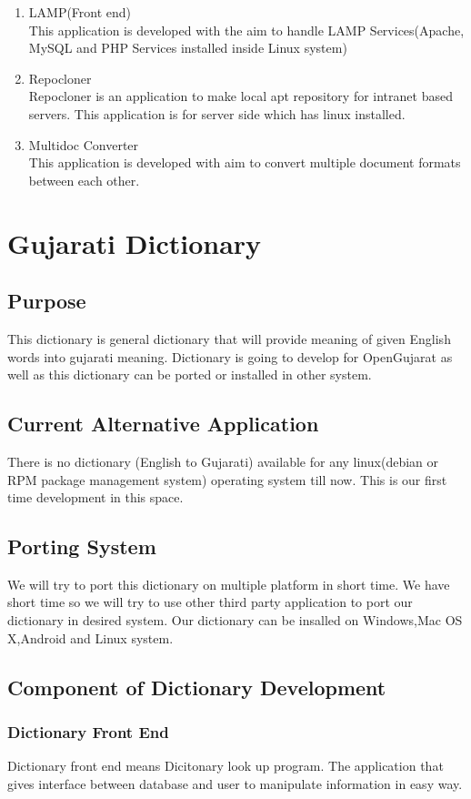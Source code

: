 \begin{enumerate}
\item	LAMP(Front end)\\
This application is developed with the aim to handle LAMP Services(Apache, MySQL and PHP Services installed inside Linux system)

\item Repocloner\\
Repocloner is an application to make local apt repository for intranet based servers.
This application is for server side which has linux installed.
\item	Multidoc Converter\\
This application is developed with aim to convert multiple document formats between each other. 
\end{enumerate}

\section{Gujarati Dictionary}
\subsection {Purpose}
	This dictionary is general dictionary that will provide meaning of given English words into gujarati meaning.
	Dictionary is going to develop for OpenGujarat as well as this dictionary can be ported or installed in other system.
\subsection{Current Alternative Application}
	There is no dictionary (English to Gujarati) available for any linux(debian or RPM package management system) operating system till now. 
	This is our first time development in this space.

\subsection{Porting System}
We will try to port this dictionary on multiple platform in short time.
We have short time so we will try to use other third party application to port our dictionary in desired system.
Our dictionary can be insalled on Windows,Mac OS X,Android and Linux system.
\subsection{Component of Dictionary Development}
\subsubsection{Dictionary Front End}
	Dictionary front end means Dicitonary look up program. The application that gives interface between database and user to manipulate information in easy way.

